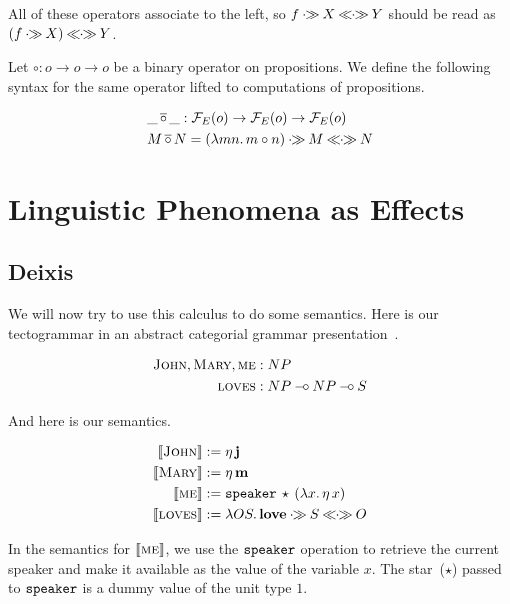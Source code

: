 \documentclass{llncs}
\newcommand{\negSpaceBeforeAlign}{\vspace{-4mm}}
\begin{document}
All of these operators associate to the left, so $f \mathbin{\cdot\!\!\gg} X \mathbin{\ll\!\!\cdot\!\!\gg} Y$ should
be read as $(f \mathbin{\cdot\!\!\gg} X) \mathbin{\ll\!\!\cdot\!\!\gg} Y$.

Let $\circ : o \to o \to o$ be a binary operator on propositions. We define
the following syntax for the same operator lifted to computations of
propositions.

\negSpaceBeforeAlign

\begin{align*}
  & \_ \mathop{\overline{\circ}} \_ : \mathcal{F}_E(o) \to \mathcal{F}_E(o) \to \mathcal{F}_E(o) \\
  & M \mathop{\overline{\circ}} N = (\lambda m n.\, m \circ n) \mathbin{\cdot\!\!\gg} M \mathbin{\ll\!\!\cdot\!\!\gg} N
\end{align*}


\section{Linguistic Phenomena as Effects}
\label{sec:phenomena}

\subsection{Deixis}
\label{ssec:deixis}

We will now try to use this calculus to do some semantics. Here is our
tectogrammar in an abstract categorial grammar
presentation~\cite{de2001towards}.

\negSpaceBeforeAlign

\begin{align*}
  \textsc{John}, \textsc{Mary}, \textsc{me} &: NP \\
  \textsc{loves} &: NP \mathbin{{-}\mkern-3.5mu{\circ}} NP \mathbin{{-}\mkern-3.5mu{\circ}} S
\end{align*}

And here is our semantics.

\negSpaceBeforeAlign

\begin{align*}
  \llbracket \textsc{John} \rrbracket &:= \eta\,\textbf{j} \\
  \llbracket \textsc{Mary} \rrbracket &:= \eta\,\textbf{m} \\
  \llbracket \textsc{me} \rrbracket &:= \mathtt{speaker}\,\star\,(\lambda x.\, \eta\,x) \\
  \llbracket \textsc{loves} \rrbracket &:= \lambda O S.\, {\textbf{love}} \mathbin{\cdot\!\!\gg} S \mathbin{\ll\!\!\cdot\!\!\gg} O
\end{align*}

In the semantics for $\llbracket \textsc{me} \rrbracket$, we use the $\mathtt{speaker}$ operation
to retrieve the current speaker and make it available as the value of the
variable $x$. The star~($\star$) passed to $\mathtt{speaker}$ is a dummy value
of the unit type $1$.
\end{document}
